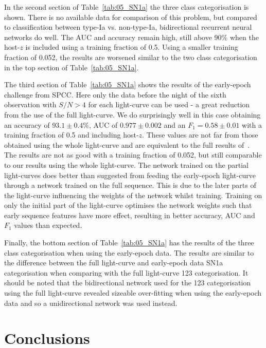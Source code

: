 \documentclass[twocolumn]{aastex61}
\begin{document}
In the second section of Table~\ref{tab:05_SN1a} the three class categorisation is shown. There is no available data for comparison of this problem, but compared to classification between type-Ia vs. non-type-Ia, bidirectional recurrent neural networks do well. The AUC and accuracy remain high, still above 90\% when the host-$z$ is included using a training fraction of 0.5. Using a smaller training fraction of 0.052, the results are worsened similar to the two class categorisation in the top section of Table~\ref{tab:05_SN1a}.

The third section of Table~\ref{tab:05_SN1a} shows the results of the early-epoch challenge from SPCC. Here only the data before the night of the sixth observation with $S/N>4$ for each light-curve can be used - a great reduction from the use of the full light-curve. We do surprisingly well in this case obtaining an accuracy of $93.1\pm0.4\%$, AUC of $0.977\pm0.002$ and an $F_1=0.58\pm 0.01$ with a training fraction of 0.5 and including host-$z$. These values are not far from those obtained using the whole light-curve and are equivalent to the full results of~\cite{Karpenka:2012pm}. The results are not as good with a training fraction of 0.052, but still comparable to our results using the whole light-curve. The network trained on the partial light-curves does better than suggested from feeding the early-epoch light-curve through a network trained on the full sequence. This is due to the later parts of the light-curve influencing the weights of the network whilst training. Training on only the initial part of the light-curve optimises the network weights such that early sequence features have more effect, resulting in better accuracy, AUC and $F_1$ values than expected.

Finally, the bottom section of Table~\ref{tab:05_SN1a} has the results of the three class categorisation when using the early-epoch data. The results are similar to the difference between the full light-curve and early-epoch data SN1a categorisation when comparing with the full light-curve 123 categorisation. It should be noted that the bidirectional network used for the 123 categorisation using the full light-curve revealed sizeable over-fitting when using the early-epoch data and so a unidirectional network was used instead.

\section{Conclusions}
\end{document}
